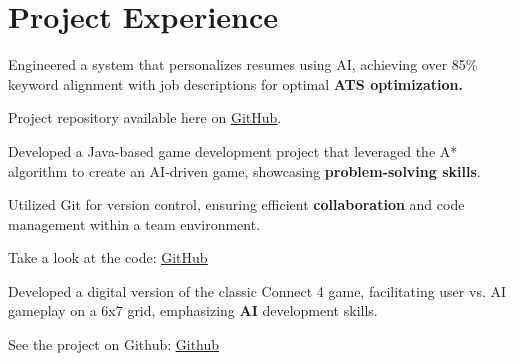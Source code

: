 \section{Project Experience}



\begin{tightemize}
    \item Engineered a system that personalizes resumes using AI, achieving over 85\% keyword alignment with job descriptions for optimal \textbf{ATS optimization.}
    \item Project repository available here on \href{https://github.com/vmsaif/ats-pass-ai}{\ul{GitHub}}.
\end{tightemize}



\begin{tightemize}
    \item Developed a Java-based game development project that leveraged the A* algorithm to create an AI-driven game, showcasing \textbf{problem-solving skills}.
    \item Utilized Git for version control, ensuring efficient \textbf{collaboration} and code management within a team environment.
    \item Take a look at the code: \href{https://github.com/vmsaif/ant-path-finding-using-A-Star-algorithm/}{\ul{GitHub}}
\end{tightemize}



\begin{tightemize}
    \item Developed a digital version of the classic Connect 4 game, facilitating user vs. AI gameplay on a 6x7 grid, emphasizing \textbf{AI} development skills.
    \item See the project on Github: \href{https://github.com/vmsaif/connect4-with-minimax-algorithm-in-java/}{\ul{Github}}
\end{tightemize}
